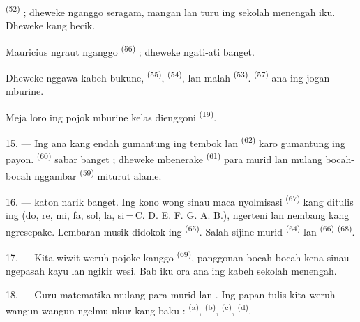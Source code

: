  \textsuperscript{(52)}  ;
dheweke nganggo seragam, mangan lan turu ing sekolah menengah iku.
Dheweke  kang becik.

Mauricius ngraut  nganggo 
\textsuperscript{(56)} ; dheweke ngati-ati banget.

Dheweke nggawa kabeh bukune, 
\textsuperscript{(55)},  \textsuperscript{(54)},
lan malah  \textsuperscript{(53)}.  \textsuperscript{(57)} ana ing jogan mburine.

Meja loro ing pojok mburine kelas dienggoni  \textsuperscript{(19)}.

\VUsaut{4.6mm}
\VUsaut{3.4mm}

15. --- Ing  ana  kang
endah gumantung ing tembok lan  \textsuperscript{(62)}
karo  gumantung ing payon. 
\textsuperscript{(60)} sabar banget ; dheweke mbenerake
 \textsuperscript{(61)} para murid lan mulang
bocah-bocah nggambar  \textsuperscript{(59)}
miturut alame.

16. ---  katon narik banget. Ing kono wong sinau
maca  nyolmisasi  \textsuperscript{(67)}
kang ditulis ing  (do, re, mi, fa, sol, la,
si\,=\,C. D. E. F. G. A. B.), ngerteni  lan
nembang  kang ngresepake. Lembaran musik didokok ing
 \textsuperscript{(65)}. Salah sijine murid
 \textsuperscript{(64)} lan 
\textsuperscript{(66)}  \textsuperscript{(68)}.

17. --- Kita wiwit weruh pojoke  kanggo  \textsuperscript{(69)}, panggonan bocah-bocah kena sinau
ngepasah kayu lan ngikir wesi. Bab iku ora ana ing kabeh sekolah
menengah.

\VUsaut{5.0mm}
\VUsaut{3.6mm}

18. --- Guru matematika mulang  para murid
 lan . Ing papan tulis kita weruh wangun-wangun ngelmu ukur kang
baku :  \textsuperscript{(a)}, 
\textsuperscript{(b)},  \textsuperscript{(c)},
 \textsuperscript{(d)}.

